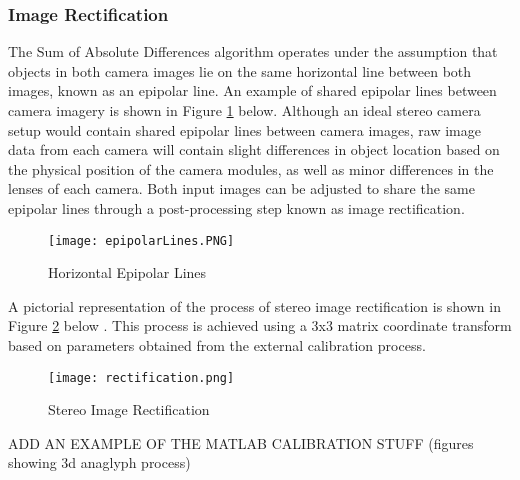 \subsubsection{Image Rectification}
The Sum of Absolute Differences algorithm operates under the assumption that objects in both camera images lie on the same horizontal line between both images, known as an epipolar line. An example of shared epipolar lines between camera imagery is shown in Figure \ref{epipolarLines} below. Although an ideal stereo camera setup would contain shared epipolar lines between camera images, raw image data from each camera will contain slight differences in object location based on the physical position of the camera modules, as well as minor differences in the lenses of each camera. Both input images can be adjusted to share the same epipolar lines through a post-processing step known as image rectification. 
\par
\begin{figure}[H]
	\centerline{\texttt{[image: epipolarLines.PNG]}}
	\caption{Horizontal Epipolar Lines \cite{collins}}
	\label{epipolarLines}
\end{figure}
\par
A pictorial representation of the process of stereo image rectification is shown in Figure \ref{rectification} below \cite{mattoccia_slides}. This process is achieved using a 3x3 matrix coordinate transform based on parameters obtained from the external calibration process. 
\begin{figure}[H]
	\centerline{\texttt{[image: rectification.png]}}
	\caption{Stereo Image Rectification \cite{mattoccia_slides}}
	\label{rectification}
\end{figure}
\par
ADD AN EXAMPLE OF THE MATLAB CALIBRATION STUFF (figures showing 3d anaglyph process)

